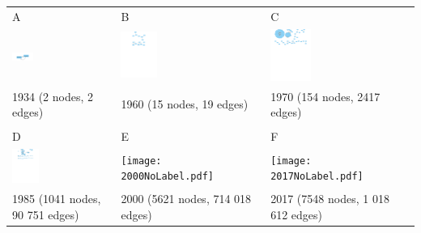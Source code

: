 \documentclass{article}
\begin{document}
\begin{tabular}{m{} m{} m{}}
  \large{A} &\large{B} &\large{C} \\
  \includegraphics[width=0.22\textwidth]{1934TEXT.pdf}
   &\includegraphics[clip, trim=3cm 19cm 3cm 0cm, width=0.26\textwidth]{1960NoLabel.pdf}
   &\includegraphics[clip, trim=2cm 19cm 2cm 0cm, width=0.29\textwidth]{1970NoLabel.pdf}\\
  \scriptsize{1934 (2 nodes, 2 edges)}&\scriptsize{1960 (15 nodes, 19 edges)}&\scriptsize{1970 (154 nodes, 2417 edges)}\\\\
  \large{D} &\large{E} &\large{F}\\
  \includegraphics[clip, trim=4cm 19cm 4cm 0cm, width=0.27\textwidth]{1985NoLabel.pdf}
   & \texttt{[image: 2000NoLabel.pdf]}
   & \texttt{[image: 2017NoLabel.pdf]}\\
 \scriptsize{1985 (1041 nodes, 90 751 edges)}&\scriptsize{2000 (5621 nodes, 714 018 edges)}&\scriptsize{2017 (7548 nodes, 1 018 612 edges)}\\
\end{tabular}
\end{document}

